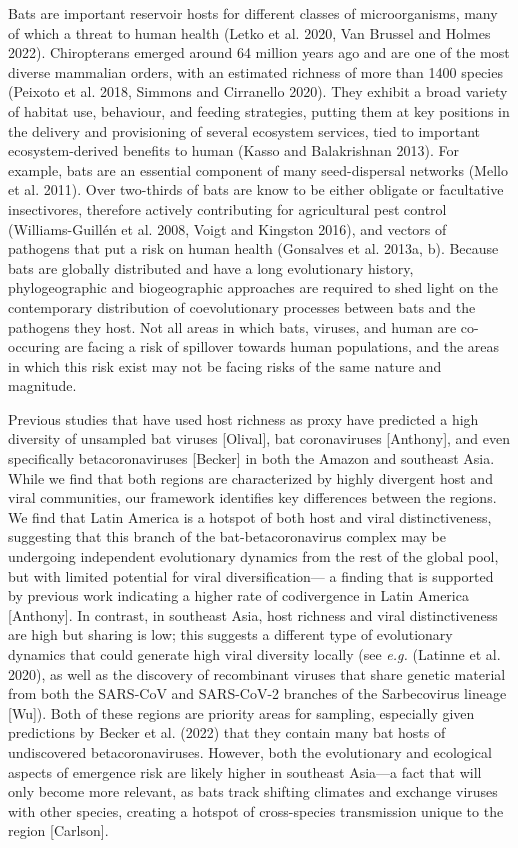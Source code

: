 \documentclass[11pt]{article}
\begin{document}
Bats are important reservoir hosts for different classes of
microorganisms, many of which a threat to human health (Letko et al.
2020, Van Brussel and Holmes 2022). Chiropterans emerged around 64
million years ago and are one of the most diverse mammalian orders, with
an estimated richness of more than 1400 species (Peixoto et al. 2018,
Simmons and Cirranello 2020). They exhibit a broad variety of habitat
use, behaviour, and feeding strategies, putting them at key positions in
the delivery and provisioning of several ecosystem services, tied to
important ecosystem-derived benefits to human (Kasso and Balakrishnan
2013). For example, bats are an essential component of many
seed-dispersal networks (Mello et al. 2011). Over two-thirds of bats are
know to be either obligate or facultative insectivores, therefore
actively contributing for agricultural pest control (Williams-Guillén et
al. 2008, Voigt and Kingston 2016), and vectors of pathogens that put a
risk on human health (Gonsalves et al. 2013a, b). Because bats are
globally distributed and have a long evolutionary history,
phylogeographic and biogeographic approaches are required to shed light
on the contemporary distribution of coevolutionary processes between
bats and the pathogens they host. Not all areas in which bats, viruses,
and human are co-occuring are facing a risk of spillover towards human
populations, and the areas in which this risk exist may not be facing
risks of the same nature and magnitude.

Previous studies that have used host richness as proxy have predicted a
high diversity of unsampled bat viruses {[}Olival{]}, bat coronaviruses
{[}Anthony{]}, and even specifically betacoronaviruses {[}Becker{]} in
both the Amazon and southeast Asia. While we find that both regions are
characterized by highly divergent host and viral communities, our
framework identifies key differences between the regions. We find that
Latin America is a hotspot of both host and viral distinctiveness,
suggesting that this branch of the bat-betacoronavirus complex may be
undergoing independent evolutionary dynamics from the rest of the global
pool, but with limited potential for viral diversification--- a finding
that is supported by previous work indicating a higher rate of
codivergence in Latin America {[}Anthony{]}. In contrast, in southeast
Asia, host richness and viral distinctiveness are high but sharing is
low; this suggests a different type of evolutionary dynamics that could
generate high viral diversity locally (see \emph{e.g.} (Latinne et al.
2020), as well as the discovery of recombinant viruses that share
genetic material from both the SARS-CoV and SARS-CoV-2 branches of the
Sarbecovirus lineage {[}Wu{]}). Both of these regions are priority areas
for sampling, especially given predictions by Becker et al. (2022) that
they contain many bat hosts of undiscovered betacoronaviruses. However,
both the evolutionary and ecological aspects of emergence risk are
likely higher in southeast Asia---a fact that will only become more
relevant, as bats track shifting climates and exchange viruses with
other species, creating a hotspot of cross-species transmission unique
to the region {[}Carlson{]}.
\end{document}
